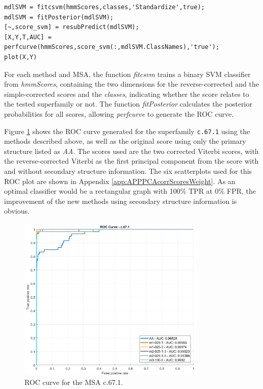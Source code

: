 \begin{lstlisting}[caption=Matlab implementation for generating the \ac{ROC} curve. ,
label=LST_svmMat]
mdlSVM = fitcsvm(hmmScores,classes,'Standardize',true);
mdlSVM = fitPosterior(mdlSVM);
[~,score_svm] = resubPredict(mdlSVM);
[X,Y,T,AUC] = perfcurve(hmmScores,score_svm(:,mdlSVM.ClassNames),'true');
plot(X,Y)
\end{lstlisting}

 For each method and \ac{MSA}, the function \textit{fitcsvm} trains a binary \ac{SVM} classifier from \textit{hmmScores}, containing the two dimensions for the reverse-corrected and the simple-corrected scores and the \textit{classes}, indicating whether the score relates to the tested superfamily or not. The function \textit{fitPosterior} calculates the posterior probabilities for all scores, allowing \textit{perfcurve} to generate the \ac{ROC} curve.



Figure \ref{fig:roc} shows the \ac{ROC} curve generated for the superfamily \texttt{c.67.1} using the methods described above, as well as the original score using only the primary structure listed as \textit{AA}. The scores used are the two corrected Viterbi scores, with the \mbox{reverse-corrected} Viterbi as the first principal component from the score with and without secondary structure information.
The six scatterplots used for this \ac{ROC} plot are shown in Appendix \ref{app:APPPCAcorrScoresWeight}.
As an optimal classifier would be a rectangular graph with 100\% \ac{TPR}  at 0\% \ac{FPR}, the improvement of the new methods using secondary structure information is obvious.

\begin{figure}[H]
	\begin{center}
		\includegraphics[width=0.8\textwidth]{fig/roc}
	\end{center}
	\caption{\acs{ROC} curve for the \acs{MSA} c.67.1.}
	\label{fig:roc}
\end{figure}

